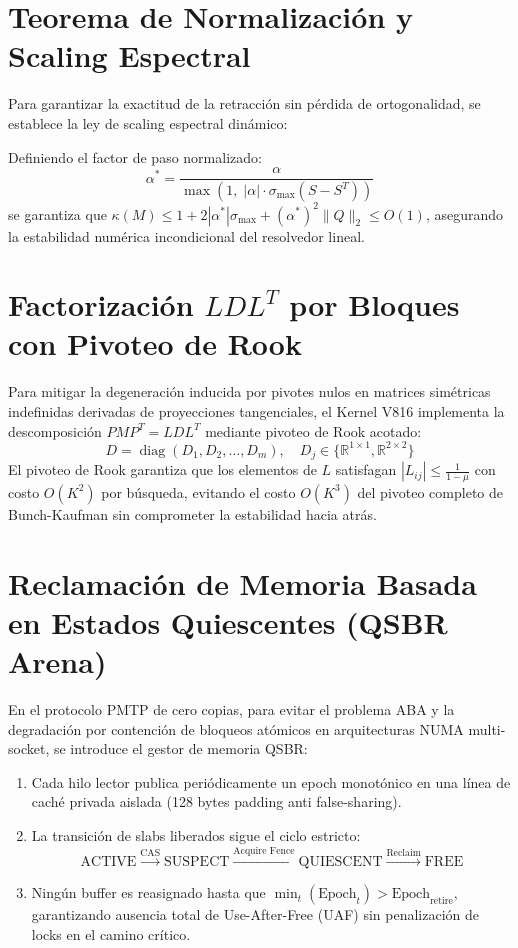 \section{Teorema de Normalización y Scaling Espectral}
Para garantizar la exactitud de la retracción sin pérdida de ortogonalidad, se establece la ley de scaling espectral dinámico:

\begin{proposition}
Definiendo el factor de paso normalizado:
\begin{equation}
\alpha^* = \frac{\alpha}{\max\left(1, \; |\alpha| \cdot \sigma_{\max}(S - S^T)\right)}
\end{equation}
se garantiza que $\kappa(M) \le 1 + 2|\alpha^*| \sigma_{\max} + (\alpha^*)^2 \|Q\|_2 \le O(1)$, asegurando la estabilidad numérica incondicional del resolvedor lineal.
\end{proposition}

\section{Factorización $LDL^T$ por Bloques con Pivoteo de Rook}
Para mitigar la degeneración inducida por pivotes nulos en matrices simétricas indefinidas derivadas de proyecciones tangenciales, el Kernel V816 implementa la descomposición $P M P^T = L D L^T$ mediante pivoteo de Rook acotado:
\begin{equation}
D = \operatorname{diag}(D_1, D_2, \dots, D_m), \quad D_j \in \{\mathbb{R}^{1 \times 1}, \mathbb{R}^{2 \times 2}\}
\end{equation}
El pivoteo de Rook garantiza que los elementos de $L$ satisfagan $|L_{ij}| \le \frac{1}{1 - \mu}$ con costo $O(K^2)$ por búsqueda, evitando el costo $O(K^3)$ del pivoteo completo de Bunch-Kaufman sin comprometer la estabilidad hacia atrás.

\section{Reclamación de Memoria Basada en Estados Quiescentes (QSBR Arena)}
En el protocolo PMTP de cero copias, para evitar el problema ABA y la degradación por contención de bloqueos atómicos en arquitecturas NUMA multi-socket, se introduce el gestor de memoria QSBR:
\begin{enumerate}
    \item Cada hilo lector publica periódicamente un epoch monotónico en una línea de caché privada aislada (128 bytes padding anti false-sharing).
    \item La transición de slabs liberados sigue el ciclo estricto:
    \begin{equation}
    \text{ACTIVE} \xrightarrow{\text{CAS}} \text{SUSPECT} \xrightarrow{\text{Acquire Fence}} \text{QUIESCENT} \xrightarrow{\text{Reclaim}} \text{FREE}
    \end{equation}
    \item Ningún buffer es reasignado hasta que $\min_{t} (\text{Epoch}_t) > \text{Epoch}_{\text{retire}}$, garantizando ausencia total de Use-After-Free (UAF) sin penalización de locks en el camino crítico.
\end{enumerate}


